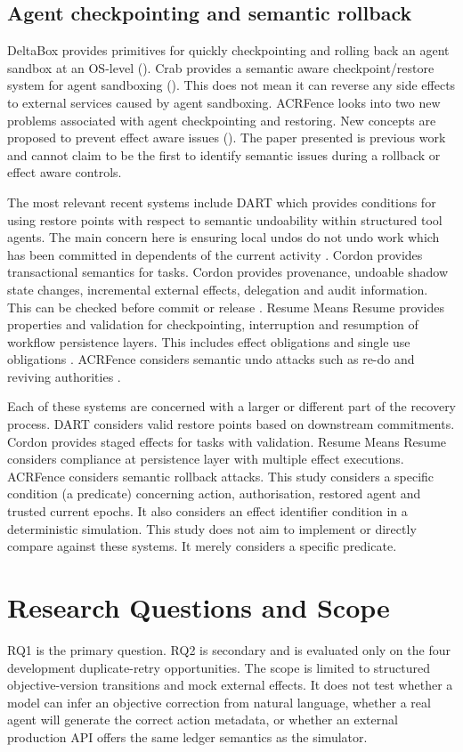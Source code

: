 \documentclass[conference]{IEEEtran}
\begin{document}
\subsection{Agent checkpointing and semantic rollback}
DeltaBox provides primitives for quickly checkpointing and rolling back an agent sandbox at an OS-level (\cite{dong2026}). Crab provides a semantic aware checkpoint/restore system for agent sandboxing (\cite{wu2026}). This does not mean it can reverse any side effects to external services caused by agent sandboxing. ACRFence looks into two new problems associated with agent checkpointing and restoring. New concepts are proposed to prevent effect aware issues (\cite{zheng2026}). The paper presented is previous work and cannot claim to be the first to identify semantic issues during a rollback or effect aware controls.

The most relevant recent systems include DART which provides conditions for using restore points with respect to semantic undoability within structured tool agents. The main concern here is ensuring local undos do not undo work which has been committed in dependents of the current activity \cite{yang2026dart}. Cordon provides transactional semantics for tasks. Cordon provides provenance, undoable shadow state changes, incremental external effects, delegation and audit information. This can be checked before commit or release \cite{chen2026cordon}. Resume Means Resume provides properties and validation for checkpointing, interruption and resumption of workflow persistence layers. This includes effect obligations and single use obligations \cite{khan2026resume}. ACRFence considers semantic undo attacks such as re-do and reviving authorities \cite{zheng2026}.

Each of these systems are concerned with a larger or different part of the recovery process. DART considers valid restore points based on downstream commitments. Cordon provides staged effects for tasks with validation. Resume Means Resume considers compliance at persistence layer with multiple effect executions. ACRFence considers semantic rollback attacks. This study considers a specific condition (a predicate) concerning action, authorisation, restored agent and trusted current epochs. It also considers an effect identifier condition in a deterministic simulation. This study does not aim to implement or directly compare against these systems. It merely considers a specific predicate.

\section{Research Questions and Scope}
RQ1 is the primary question. RQ2 is secondary and is evaluated only on the four development duplicate-retry opportunities. The scope is limited to structured objective-version transitions and mock external effects. It does not test whether a model can infer an objective correction from natural language, whether a real agent will generate the correct action metadata, or whether an external production API offers the same ledger semantics as the simulator.
\end{document}

